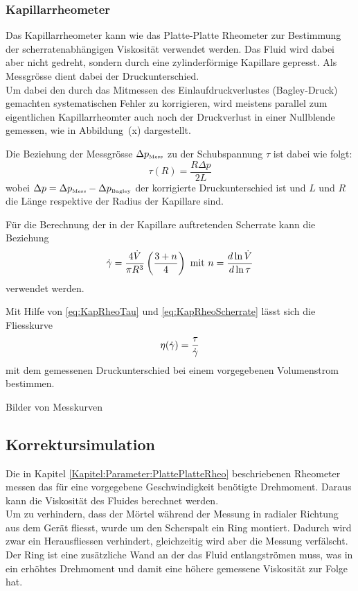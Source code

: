 \subsubsection{Kapillarrheometer}
Das Kapillarrheometer kann wie das Platte-Platte Rheometer zur Bestimmung der scherratenabhängigen Viskosität verwendet werden. Das Fluid wird dabei aber nicht gedreht, sondern durch eine zylinderförmige Kapillare gepresst. Als Messgrösse dient dabei der Druckunterschied.\\
Um dabei den durch das Mitmessen des Einlaufdruckverlustes (Bagley-Druck) gemachten systematischen Fehler zu korrigieren, wird meistens parallel zum eigentlichen Kapillarrheomter auch noch der Druckverlust in einer Nullblende gemessen, wie in Abbildung~(x) dargestellt. 

Die Beziehung der Messgrösse $\Delta p_{\mbox{\tiny Mess}}$ zu der Schubspannung $\tau$ ist dabei wie folgt:
\begin{equation}
    \label{eq:KapRheoTau}
    \tau\left( R \right) = \frac{R \Delta p}{2L}
\end{equation}
wobei $\Delta p = \Delta p_{\mbox{\tiny Mess}} -\Delta p_{\mbox{\tiny Bagley}}$ der korrigierte Druckunterschied ist und $L$ und $R$ die Länge respektive der Radius der Kapillare sind.

Für die Berechnung der in der Kapillare auftretenden Scherrate kann die Beziehung
\begin{equation}
    \label{eq:KapRheoScherrate}
    \dot\gamma = \frac{4 \dot{V}}{\pi R^3}\left( \frac{3+n}{4} \right) \mbox{ mit } n=\frac{d \ln \dot{V}}{d\ln\tau}
\end{equation}
verwendet werden.

Mit Hilfe von \eqref{eq:KapRheoTau} und \eqref{eq:KapRheoScherrate} lässt sich die Fliesskurve 
\begin{equation}
    \eta(\dot\gamma) = \frac{\tau}{\dot\gamma}
\end{equation}
mit dem gemessenen Druckunterschied bei einem vorgegebenen Volumenstrom bestimmen.
%
\begin{todocontent}
    \1 Bilder von Messkurven
\end{todocontent}
%
\subsection{Korrektursimulation}
\label{Kapitel:Korrektursimulation}
Die in Kapitel \ref{Kapitel:Parameter:PlattePlatteRheo} beschriebenen Rheometer messen das für eine vorgegebene Geschwindigkeit benötigte Drehmoment. Daraus kann die Viskosität des Fluides berechnet werden.\\
Um zu verhindern, dass der Mörtel während der Messung in radialer Richtung aus dem Gerät fliesst, wurde um den Scherspalt ein Ring montiert. Dadurch wird zwar ein Herausfliessen verhindert, gleichzeitig wird aber die Messung verfälscht. Der Ring ist eine zusätzliche Wand an der das Fluid entlangströmen muss, was in ein erhöhtes Drehmoment und damit eine höhere gemessene Viskosität zur Folge hat.

